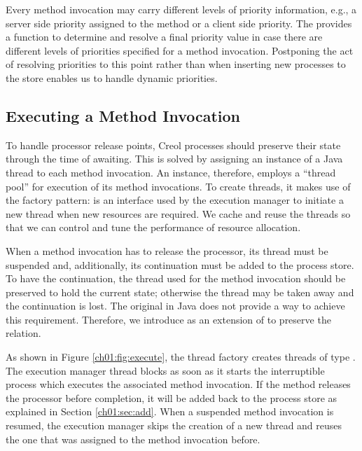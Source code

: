 Every method invocation may carry different levels of priority information,
e.g., a server side priority assigned to the method or a
client side priority. 
The  
provides a function to determine and
resolve a final priority value in case there are different levels of priorities
specified for a method invocation. 
Postponing the act of resolving priorities to this point rather than when inserting new processes to the store enables us to handle dynamic priorities.


\subsection{Executing a Method Invocation}

To handle processor release points, Creol processes should preserve
their state through the time of awaiting.
This is solved by assigning an instance of a Java thread to each method
invocation. 
An  instance, therefore, employs a ``thread pool''
for execution of its method invocations. 
To create threads, it makes use of the factory pattern:
 is an interface used by the execution manager to
initiate a new thread when new resources are required. 
We cache and reuse the threads so that we can control and tune the performance of resource allocation. 

When a method invocation has to release the processor, its thread must
be suspended and, additionally, its continuation must be added to the
process store. To have the continuation, the thread used for the method
invocation should be preserved to hold the current state; otherwise the
thread may be taken away and the continuation is lost.
The original  in Java does not provide a way to achieve this
requirement.
Therefore, we introduce  as an extension of
 to preserve the relation.


As shown in Figure \ref{ch01:fig:execute}, the thread factory creates threads of type  {}.
The execution manager thread blocks as soon as it starts the interruptible process which executes the associated  method invocation. 
If the method releases the processor before completion, it will be added back to the process store as explained in Section \ref{ch01:sec:add}.
When a suspended method invocation is resumed, the execution manager skips the creation of a new thread and  reuses the one that was assigned to the method invocation before.

